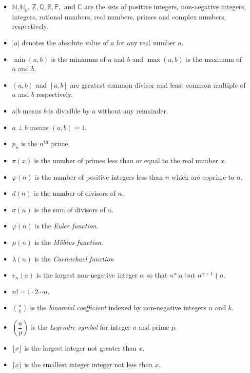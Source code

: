 \documentclass{subfile}
\begin{document}
		\begin{itemize}
			\item $\mathbb{N,N}_0$, $\mathbb{Z, Q, R, P},$ and $\mathbb{C}$ are the sets of positive integers, non-negative integers, integers, rational numbers, real numbers, primes and complex numbers, respectively.
			\item $|a|$ denotes the absolute value of $a$ for any real number $a$.
			\item $\min(a,b)$ is the minimum of $a$ and $b$ and $\max(a,b)$ is the maximum of $a$ and $b$.
			\item $(a,b)$ and $[a,b]$ are greatest common divisor and least common multiple of $a$ and $b$ respectively.
			\item $a|b$ means $b$ is divisible by $a$ without any remainder.
			\item $a\perp b$ means $(a,b)=1$.
			\item $p_n$ is the $n^{\text{th}}$ prime.
			\item $\pi(x)$ is the number of primes less than or equal to the real number $x$.		
			\item $\varphi(n)$ is the number of positive integers less than $n$ which are coprime to $n$.
			\item $d(n)$ is the number of divisors of $n$.
			\item $\sigma(n)$ is the sum of divisors of $n$.
			\item $\varphi(n)$ is the {\it Euler function}.
			\item $\mu(n)$ is the {\it M\H{o}bius function}.
			\item $\lambda(n)$ is the {\it Carmichael function}
			\item $v_n(a)$ is the largest non-negative integer $\alpha$ so that $n^\alpha|a$ but $n^{\alpha+1}\nmid a$.
			\item $n!=1\cdot2\cdots n$.
			\item $\displaystyle \binom{n}{k}$ is the \textit{binomial coefficient} indexed by non-negative integers $n$ and $k$.
			\item $\left(\dfrac{a}{p}\right)$ is the \textit{Legendre symbol} for integer $a$ and prime $p$.
			\item $\lfloor x \rfloor$ is the  largest integer not greater than $x$.
			\item $\lceil x \rceil$ is the smallest integer integer not less than $x$.
		\end{itemize}
	
		\newpage
\end{document}
